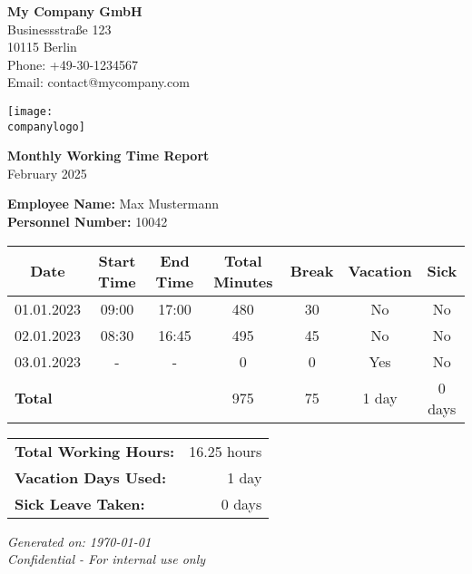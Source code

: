 \documentclass[11pt]{article}
\makeatletter
\newcommand{\companyname}{My Company GmbH} %
\newcommand{\companystreet}{Businessstraße 123} %
\newcommand{\companycity}{10115 Berlin} %
\newcommand{\companyphone}{+49-30-1234567} %
\newcommand{\companyemail}{contact@mycompany.com} %
\newcommand{\companylogo}{company_logo.png} %
\newcommand{\employeename}{Max Mustermann} %
\newcommand{\employeenumber}{10042} %
\newcommand{\reportperiod}{February 2025} %
\makeatother
\begin{document}
\begin{minipage}{0.6\textwidth}
    \textbf{\companyname} \\
    \companystreet \\
    \companycity \\
    Phone: \companyphone \\
    Email: \companyemail \\
\end{minipage}
\begin{minipage}{0.38\textwidth}
    \raggedleft
    \texttt{[image: \\companylogo]} %
\end{minipage}

\vspace{1cm}

\begin{center}
    {\LARGE \textbf{Monthly Working Time Report}} \\
    \vspace{0.5cm}
    \reportperiod
\end{center}

\vspace{1cm}

\noindent
\textbf{Employee Name:} \employeename \\
\textbf{Personnel Number:} \employeenumber

\vspace{1cm}

\begin{center}
\begin{longtable}{|c|c|c|c|c|c|c|}
    \hline
    \textbf{Date} & \textbf{Start Time} & \textbf{End Time} & \textbf{Total Minutes} & \textbf{Break} & \textbf{Vacation} & \textbf{Sick} \\
    \hline
    01.01.2023 & 09:00 & 17:00 & 480 & 30 & No & No \\
    02.01.2023 & 08:30 & 16:45 & 495 & 45 & No & No \\
    03.01.2023 & - & - & 0 & 0 & Yes & No \\
    \hline
    \multicolumn{3}{|l|}{\textbf{Total}} & 975 & 75 & 1 day & 0 days \\
    \hline
\end{longtable}
\end{center}

\begin{center}
\begin{tabular}{lr}
    \textbf{Total Working Hours:} & 16.25 hours \\
    \textbf{Vacation Days Used:} & 1 day \\
    \textbf{Sick Leave Taken:} & 0 days \\[0.5cm]
\end{tabular}
\end{center}

\vspace{1cm}

\noindent
\begin{flushleft}
    \small
    \textit{Generated on: \today} \\
    \textit{Confidential - For internal use only}
\end{flushleft}
\end{document}
